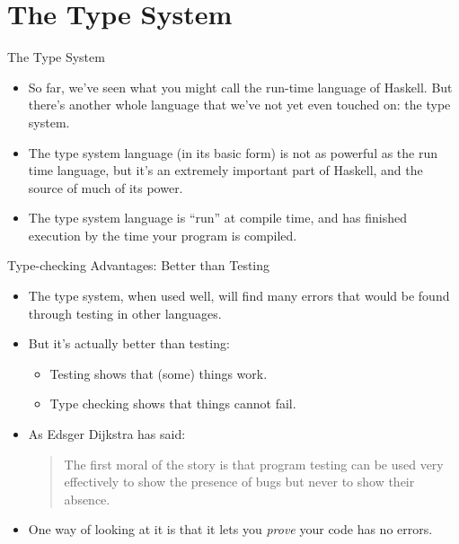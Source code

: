 \documentclass[xcolor=dvipsnames]{beamer}          %
\begin{document}
\section{The Type System}

\begin{frame}[fragile]{The Type System}
\begin{itemize}
    \item So far, we've seen what you might call the run-time language
        of Haskell. But there's another whole language that we've not
        yet even touched on: the type system.
    \item The type system language (in its basic form) is not as powerful
         as the run time language, but it's an extremely important part
         of Haskell, and the source of much of its power.
    \item The type system language is ``run'' at compile time, and has
        finished execution by the time your program is compiled.
\end{itemize}
\end{frame}


\begin{frame}[fragile]{Type-checking Advantages: Better than Testing}
\begin{itemize}
    \item The type system, when used well, will find many errors that
        would be found through testing in other languages.
    \item But it's actually better than testing:
        \begin{itemize}
            \item Testing shows that (some) things work.
            \item Type checking shows that things cannot fail.
        \end{itemize}
    \item As Edsger Dijkstra has said:\\
        \begin{quote}
        The first moral of the story is that program testing can be used very
        effectively to show the presence of bugs but never to show their
        absence.
        \end{quote}
    \item One way of looking at it is that it lets you \emph{prove} your
        code has no errors.
\end{itemize}
\end{frame}
\end{document}
